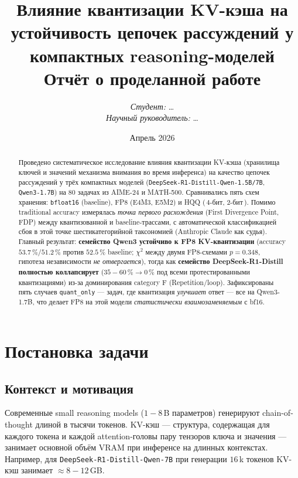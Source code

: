 \documentclass[11pt, a4paper]{article}
\title{\textbf{Влияние квантизации KV-кэша на устойчивость цепочек рассуждений у компактных reasoning-моделей} \\[0.3em]
       \large Отчёт о проделанной работе}
\author{\textit{Студент:} \ldots \\
        \textit{Научный руководитель:} \ldots}
\date{Апрель 2026}
\newcommand{\code}[1]{\texttt{#1}}
\newcommand{\chisq}{$\chi^{2}$}
\begin{document}
\maketitle

\begin{abstract}
\noindent
Проведено систематическое исследование влияния квантизации KV-кэша
(хранилища ключей и значений механизма внимания во время инференса)
на качество цепочек рассуждений у трёх компактных моделей
(\code{DeepSeek-R1-Distill-Qwen-1.5B/7B}, \code{Qwen3-1.7B}) на $80$
задачах из AIME-24 и MATH-500. Сравнивались пять схем хранения:
\code{bfloat16} (baseline), FP8 (E4M3, E5M2) и HQQ (\,4-бит, 2-бит\,).
Помимо traditional accuracy измерялась \emph{точка первого расхождения}
(First Divergence Point, FDP) между квантизованной и baseline-трассами,
с автоматической классификацией сбоя в этой точке шестикатегорийной
таксономией (Anthropic Claude как судья). Главный результат:
\textbf{семейство Qwen3 устойчиво к FP8 KV-квантизации} (accuracy
$53.7\,\%/51.2\,\%$ против $52.5\,\%$ baseline; \chisq{} между двумя
FP8-схемами $p=0.348$, гипотеза независимости \emph{не отвергается}),
тогда как \textbf{семейство DeepSeek-R1-Distill полностью коллапсирует}
($35{-}60\,\% \to 0\,\%$ под всеми протестированными квантизациями) из-за
доминирования category F (Repetition/loop). Зафиксированы пять случаев
\code{quant\_only} — задач, где квантизация \emph{улучшает} ответ —
все на Qwen3-1.7B, что делает FP8 на этой модели \emph{статистически
взаимозаменяемым} с bf16.
\end{abstract}

\tableofcontents
\bigskip

\section{Постановка задачи}

\subsection{Контекст и мотивация}

Современные small reasoning models ($1{-}8\,$B параметров) генерируют
chain-of-thought длиной в тысячи токенов. KV-кэш — структура,
содержащая для каждого токена и каждой attention-головы пару тензоров
ключа и значения — занимает основной объём VRAM при инференсе на
длинных контекстах. Например, для \code{DeepSeek-R1-Distill-Qwen-7B}
при генерации $16\,$k токенов KV-кэш занимает $\approx 8{-}12\,$GB.
\end{document}
